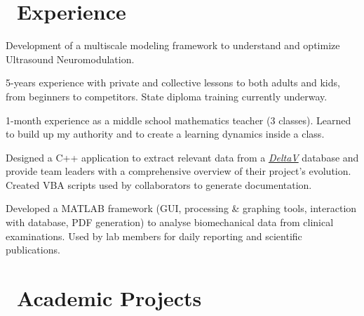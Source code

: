 \documentclass[a4paper]{cv}
\begin{document}
\begin{minipage}[t]{0.6\textwidth}

\section{\texorpdfstring{\faBriefcase}\ \ Experience}\sectionline

Development of a multiscale modeling framework to understand and optimize Ultrasound Neuromodulation.
\sectionspace

5-years experience with private and collective lessons to both adults and kids, from beginners to competitors. State diploma training currently underway.
\sectionspace

1-month experience as a middle school mathematics teacher (3 classes). Learned to build up my authority and to create a learning dynamics inside a class.
\sectionspace

Designed a C++ application to extract relevant data from a \href{http://www3.emersonprocess.com/deltav/version13/}{\emph{DeltaV}} database and provide team leaders with a comprehensive overview of their project's evolution. Created VBA scripts used by collaborators to generate documentation.
\sectionspace

Developed a MATLAB framework (GUI, processing \& graphing tools, interaction with database, PDF generation) to analyse biomechanical data from clinical examinations. Used by lab members for daily reporting and scientific publications.\sectionspace

\section{\texorpdfstring{\faClipboard} \ \ Academic Projects}\sectionline


\end{minipage}
\end{document}
